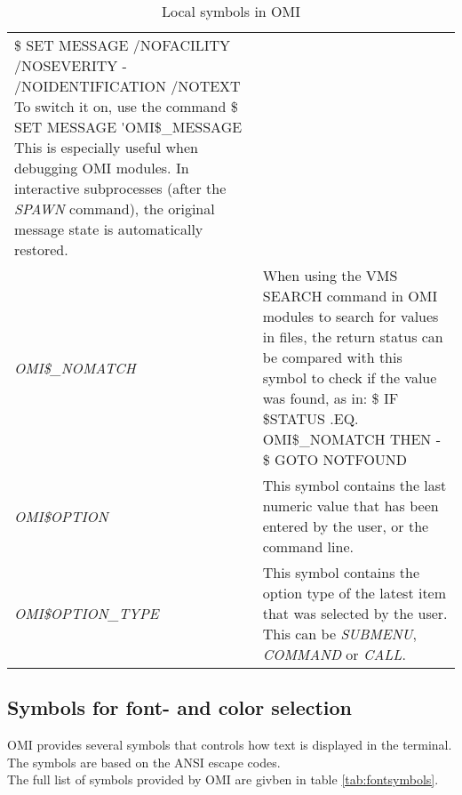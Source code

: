 \documentclass[a4paper]{book}
\renewcommand{\indent}{\hspace*{5mm}}
\begin{document}
\begin{table}[h!tb]
\begin{minipage}[h!tb]{\textwidth}
\begin{tabular}{lp{9cm}}
\indent\small{\textsf{{\$} SET MESSAGE /NOFACILITY /NOSEVERITY -}} \newline
\indent\indent\small{\textsf{/NOIDENTIFICATION /NOTEXT}} \newline
To switch it on, use the command \newline
\indent\small{\textsf{{\$} SET MESSAGE \'{}OMI{\$}{\_}MESSAGE}} \newline
This is especially useful when debugging OMI modules. In interactive subprocesses
(after the \textsl{SPAWN} command), the original message state is
automatically restored. \\
\textsl{OMI{\$}{\_}NOMATCH}\index{OMI{\$}{\_}NOMATCH}\index{OMI symbols!local symbols!OMI{\$}{\_}NOMATCH} & 
When using the VMS SEARCH command in OMI modules to search for 
values in files, the return status can be compared with this 
symbol to check if the value was found, as in: \linebreak
\indent\small{\textsf{{\$} IF {\$}STATUS .EQ. OMI{\$}{\_}NOMATCH THEN -}}\newline
\indent\indent\small{\textsf{{\$} GOTO NOTFOUND}}\\
\textsl{OMI{\$}OPTION}\index{OMI{\$}OPTION}\index{OMI symbols!local symbols!OMI{\$}OPTION} & 
This symbol contains the last numeric value that has been entered 
by the user, or the command line. \\
\textsl{OMI{\$}OPTION\_TYPE}\index{OMI{\$}OPTION\_TYPE}\index{OMI symbols!local symbols!OMI{\$}OPTION\_TYPE} & 
This symbol contains the option type of the latest item that was selected by
the user. This can be \textsl{SUBMENU}, \textsl{COMMAND} or \textsl{CALL}. \\
\hline
\end{tabular}
\caption{Local symbols in OMI}\label{tab:locsymbols}
\end{minipage}
\end{table}

\subsection{Symbols for font- and color selection}\label{subsection:fontcolors}

OMI provides several symbols that controls how text is displayed in the terminal. The symbols are based on the ANSI escape codes. \\
The full list of symbols provided by OMI are givben in table \ref{tab:fontsymbols}.
\end{document}
